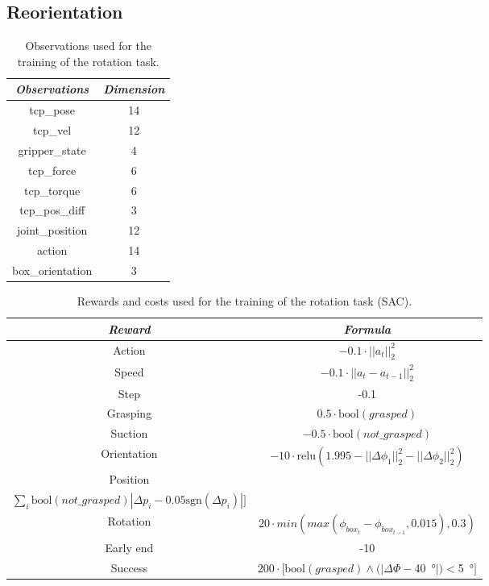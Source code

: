 \documentclass[letterpaper, 10 pt, conference]{ieeeconf}  %
\begin{document}
\subsection{Reorientation}

\begin{table}[H]
    \centering
    \caption{Observations used for the training of the rotation task.}
    \renewcommand{\arraystretch}{1.5}
    \begin{tabular}{c|c}
    \toprule \textit{\textbf{Observations}} & \textit{\textbf{Dimension}} \\
    \midrule tcp\_pose & 14\\
    tcp\_vel & 12 \\
    gripper\_state & 4 \\
    tcp\_force & 6 \\
    tcp\_torque & 6 \\
    tcp\_pos\_diff & 3 \\
    joint\_position & 12 \\
    action & 14 \\
    box\_orientation & 3 \\
    \bottomrule
    \end{tabular}
    \label{rot_obs}
\end{table}

\begin{table}[H]
    \centering
    \caption{Rewards and costs used for the training of the rotation task (SAC).}
    \renewcommand{\arraystretch}{1.5}
    \begin{tabular}{c|c}
    \toprule \textbf{\textit{Reward}} & \textbf{\textit{Formula}}\\
    \midrule Action & $-0.1\cdot || a_{t} ||^2_2$\\
    Speed  & $-0.1\cdot || a_t - a_{t-1}||^2_2$\\
    Step & -0.1\\
    Grasping & $0.5\cdot \text{bool}(grasped) $\\
    Suction & $-0.5\cdot \text{bool}(not\_grasped) $\\
    Orientation & $-10\cdot \text{relu}(1.995 - ||\Delta\phi_{1}||^2_2 - ||\Delta\phi_{2}||^2_2)$\\
    Position & \makecell{$-15\cdot [\sum_i\text{bool}(grasped)|\Delta p_{i} - 0.35\text{sgn}(\Delta p_{i})|+$ \\ $\sum_i \text{bool}(not\_grasped)|\Delta p_{i} - 0.05\text{sgn}(\Delta p_{i})|]$}\\
    Rotation & $20\cdot min(max(\phi_{box_t} - \phi_{box_{t-1}}, 0.015), 0.3)$\\
    Early end & -10 \\
    Success & $200\cdot [\text{bool}(grasped)\land (|\Delta\Phi-$\SI{40}{\degree}$|)<$\SI{5}{\degree}$]$ \\
    \bottomrule
    \end{tabular}
    \label{rot_sac_rew}
\end{table}
\end{document}
